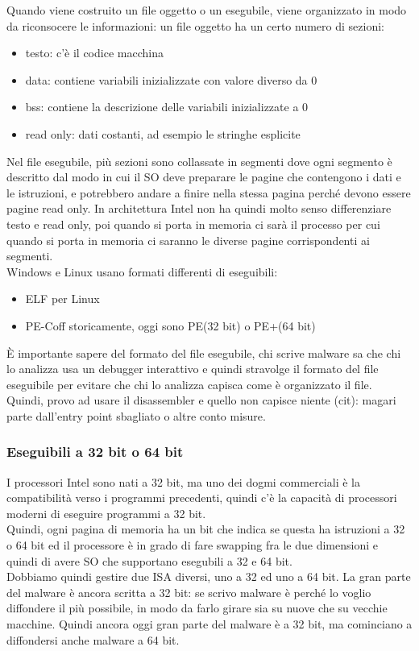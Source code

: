\documentclass[12pt, oneside]{extbook}
\begin{document}
Quando viene costruito un file oggetto o un esegubile, viene organizzato in modo da riconsocere le informazioni: un file oggetto ha un certo numero di sezioni:
\begin{itemize}
\item testo: c'è il codice macchina
\item data: contiene variabili inizializzate con valore diverso da 0
\item bss: contiene la descrizione delle variabili inizializzate a 0
\item read only: dati costanti, ad esempio le stringhe esplicite
\end{itemize}
Nel file esegubile, più sezioni sono collassate in segmenti dove ogni segmento è descritto dal modo in cui il SO deve preparare le pagine che contengono i dati e le istruzioni, e potrebbero andare a finire nella stessa pagina perché devono essere pagine read only. In architettura Intel non ha quindi molto senso differenziare testo e read only, poi quando si porta in memoria ci sarà il processo per cui quando si porta in memoria ci saranno le diverse pagine corrispondenti ai segmenti.\\ Windows e Linux usano formati differenti di eseguibili:
\begin{itemize}
\item ELF per Linux
\item PE-Coff storicamente, oggi sono PE(32 bit) o PE+(64 bit)
\end{itemize}
È importante sapere del formato del file esegubile, chi scrive malware sa che chi lo analizza usa un debugger interattivo e quindi stravolge il formato del file eseguibile per evitare che chi lo analizza capisca come è organizzato il file. Quindi, provo ad usare il disassembler e quello non capisce niente (cit): magari parte dall'entry point sbagliato o altre conto misure.
\subsubsection{Eseguibili a 32 bit o 64 bit}
I processori Intel sono nati a 32 bit, ma uno dei dogmi commerciali è la compatibilità verso i programmi precedenti, quindi c'è la capacità di processori moderni di eseguire programmi a 32 bit.\\ Quindi, ogni pagina di memoria ha un bit che indica se questa ha istruzioni a 32 o 64 bit ed il processore è in grado di fare swapping fra le due dimensioni e quindi di avere SO che supportano esegubili a 32 e 64 bit. \\ Dobbiamo quindi gestire due ISA diversi, uno a 32 ed uno a 64 bit. La gran parte del malware è ancora scritta a 32 bit: se scrivo malware è perché lo voglio diffondere il più possibile, in modo da farlo girare sia su nuove che su vecchie macchine. Quindi ancora oggi gran parte del malware è a 32 bit, ma cominciano a diffondersi anche malware a 64 bit.
\end{document}
